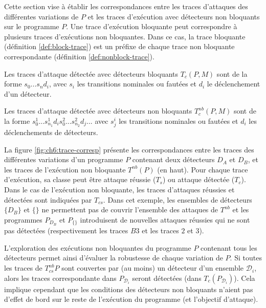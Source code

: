             Cette section vise à établir les correspondances entre les traces d'attaques des différentes variations de $P$ et les traces d'exécution avec détecteurs non bloquants sur le programme $P$.     
            Une trace d'exécution bloquante peut correspondre à plusieurs traces d'exécutions non bloquantes. Dans ce cas, la trace bloquante (définition \ref{def:block-trace}) est un préfixe de chaque trace non bloquante correspondante (définition \ref{def:nonblock-trace}).
            
            \begin{defi}
                \label{def:block-trace}
                Les traces d'attaque détectée avec détecteurs bloquants $T_c(P, M)$ sont de la forme $s_0 ... s_n d_i$, avec $s_i$ les transitions nominales ou fautées et $d_i$ le déclenchement d'un détecteur.
            \end{defi}
            
            \begin{defi}
                \label{def:nonblock-trace}
                Les traces d'attaque détectée avec détecteurs non bloquants $T_{c}^{nb}(P, M)$ sont de la forme $s^1_0 ... s^1_{n_1} d_i s^2_0 ... s^2_{n_2} d_j ...$ avec $s^i_j$ les transitions nominales ou fautées et $d_i$ les déclenchements de détecteurs.
            \end{defi}
                    
            La figure \ref{fig:ch6:trace-corresp} présente les correspondances entre les traces des différentes variations d'un programme $P$ contenant deux détecteurs $D_A$ et $D_B$, et les traces de l'exécution non bloquante $T^{nb}(P)$ (en haut).
            Pour chaque trace d'exécution, sa classe peut être attaque réussie ($T_s$) ou attaque détectée ($T_c$). 
            Dans le cas de l'exécution non bloquante, les traces d'attaques réussies et détectées sont indiquées par $T_{cs}$.
            Dans cet exemple, les ensembles de détecteurs $\{D_B\}$ et $\{\}$ ne permettent pas de couvrir l'ensemble des attaques de $T^{nb}$ et les programmes $P_{D_B}$ et $P_{\{\}}$ introduisent de nouvelles attaques réussies qui ne sont pas détectées (respectivement les traces $B3$ et les traces $2$ et $3$).
            
            L'exploration des exécutions non bloquantes du programme $P$ contenant tous les détecteurs permet ainsi d'évaluer la robustesse de chaque variation de $P$.
            Si toutes les traces de $T^{nb}_{cs}{P}$ sont couvertes par (au moins) un détecteur d'un ensemble $\mathcal{D}_{i}$, alors les traces correspondante dans $P_{\mathcal{D}_{i}}$ seront détectées (dans $T_c(P_{\mathcal{D}_{i}})$).
            Cela implique cependant que les conditions des détecteurs non bloquants n'aient pas d'effet de bord sur le reste de l'exécution du programme (et l'objectif d'attaque).
                     

